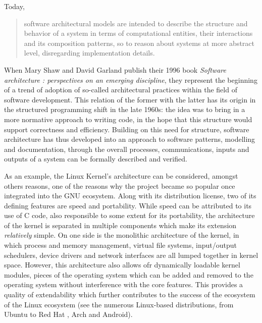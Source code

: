 Today,
\begin{quote}
  software architectural models are intended to describe the structure and behavior of a system in terms of computational entities, their interactions and its composition patterns, so to reason about systems at more abstract  level, disregarding implementation details. \citep{garland_software_2000}
\end{quote}

When Mary Shaw and David Garland publish their 1996 book \emph{Software architecture : perspectives on an emerging discipline}, they represent the beginning of a trend of adoption of so-called architectural practices within the field of software development. This relation of the former with the latter has its origin in the structured programming shift in the late 1960s: the idea was to bring in a more normative approach to writing code, in the hope that this structure would support correctness and efficiency. Building on this need for structure, software architecture has thus developed into an approach to software patterns, modelling and documentation, through the overall processes, communications, inputs and outputs of a system can be formally described and verified.

As an example, the Linux Kernel's architecture can be considered, amongst others reasons, one of the reasons why the project became so popular once integrated into the GNU ecosystem. Along with its distribution license, two of its defining features are speed and portability. While speed can be attributed to its use of C code, also responsible to some extent for its portability, the architecture of the kernel is separated in multiple components which make its extension \emph{relatively} simple. On one side is the monolithic architecture of the kernel, in which process and memory management, virtual file systems, input/output schedulers, device drivers and network interfaces are all lumped together in kernel space. However, this architecture also allows ofr dynamically loadable kernel modules, pieces of the operating system which can be added and removed to the operating system without interference with the core features. This provides a quality of extendability which further contributes to the success of the ecosystem of the Linux ecosystem (see the numerous Linux-based distributions, from Ubuntu to Red Hat , Arch and Android).

